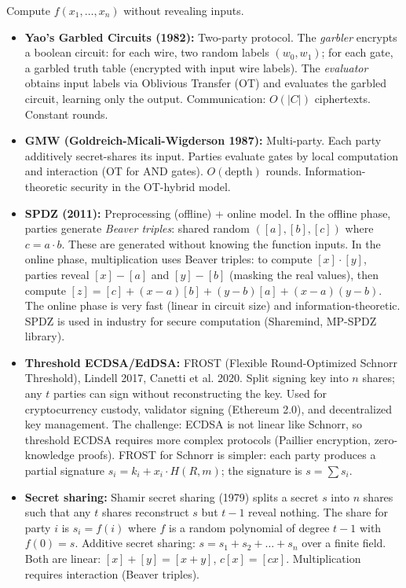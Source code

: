 Compute $f(x_1,\dots,x_n)$ without revealing inputs.

\begin{itemize}
\item \textbf{Yao's Garbled Circuits (1982):} Two-party protocol. The \emph{garbler} encrypts a boolean circuit: for each wire, two random labels $(w_0, w_1)$; for each gate, a garbled truth table (encrypted with input wire labels). The \emph{evaluator} obtains input labels via Oblivious Transfer (OT) and evaluates the garbled circuit, learning only the output. Communication: $O(|C|)$ ciphertexts. Constant rounds.

\item \textbf{GMW (Goldreich-Micali-Wigderson 1987):} Multi-party. Each party additively secret-shares its input. Parties evaluate gates by local computation and interaction (OT for AND gates). $O(\text{depth})$ rounds. Information-theoretic security in the OT-hybrid model.

\item \textbf{SPDZ (2011):} Preprocessing (offline) + online model. In the offline phase, parties generate \emph{Beaver triples}: shared random $([a], [b], [c])$ where $c = a \cdot b$. These are generated without knowing the function inputs. In the online phase, multiplication uses Beaver triples: to compute $[x] \cdot [y]$, parties reveal $[x] - [a]$ and $[y] - [b]$ (masking the real values), then compute $[z] = [c] + (x - a)[b] + (y - b)[a] + (x - a)(y - b)$. The online phase is very fast (linear in circuit size) and information-theoretic. SPDZ is used in industry for secure computation (Sharemind, MP-SPDZ library).

\item \textbf{Threshold ECDSA/EdDSA:} FROST (Flexible Round-Optimized Schnorr Threshold), Lindell 2017, Canetti et al. 2020. Split signing key into $n$ shares; any $t$ parties can sign without reconstructing the key. Used for cryptocurrency custody, validator signing (Ethereum 2.0), and decentralized key management. The challenge: ECDSA is not linear like Schnorr, so threshold ECDSA requires more complex protocols (Paillier encryption, zero-knowledge proofs). FROST for Schnorr is simpler: each party produces a partial signature $s_i = k_i + x_i \cdot H(R, m)$; the signature is $s = \sum s_i$.

\item \textbf{Secret sharing:} Shamir secret sharing (1979) splits a secret $s$ into $n$ shares such that any $t$ shares reconstruct $s$ but $t-1$ reveal nothing. The share for party $i$ is $s_i = f(i)$ where $f$ is a random polynomial of degree $t-1$ with $f(0) = s$. Additive secret sharing: $s = s_1 + s_2 + \dots + s_n$ over a finite field. Both are linear: $[x] + [y] = [x+y]$, $c[x] = [cx]$. Multiplication requires interaction (Beaver triples).


\end{itemize}
